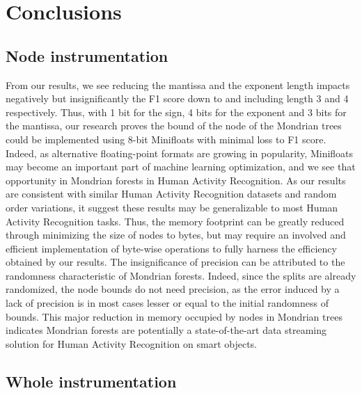 \documentclass[conference]{IEEEtran}
\begin{document}
\section{Conclusions}

\subsection{Node instrumentation}

From our results, we see reducing the mantissa and the exponent length impacts
negatively but insignificantly the F1 score down to and including length 3 and 4
respectively. Thus, with 1 bit for the sign, 4 bits for the exponent and 3 bits
for the mantissa, our research proves the bound of the node of the Mondrian
trees could be implemented using 8-bit Minifloats with minimal loss to F1 score.
Indeed, as alternative floating-point formats are growing in popularity,
Minifloats may become an important part of machine learning optimization, and we
see that opportunity in Mondrian forests in Human Activity Recognition. As our
results are consistent with similar Human Activity Recognition datasets and
random order variations, it suggest these results may be generalizable to most
Human Activity Recognition tasks. Thus, the memory footprint can be greatly
reduced through minimizing the size of nodes to bytes, but may require an
involved and efficient implementation of byte-wise operations to fully harness
the efficiency obtained by our results. The insignificance of precision can be
attributed to the randomness characteristic of Mondrian forests. Indeed, since
the splits are already randomized, the node bounds do not need precision, as the
error induced by a lack of precision is in most cases lesser or equal to the
initial randomness of bounds. This major reduction in memory occupied by nodes
in Mondrian trees indicates Mondrian forests are potentially a state-of-the-art
data streaming solution for Human Activity Recognition on smart objects.

\subsection{Whole instrumentation}
\end{document}

